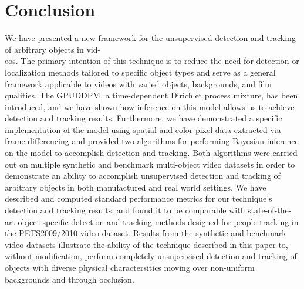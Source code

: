 \documentclass{article}
\begin{document}

\section{Conclusion}
\label{sec:conclusion}

We have presented a new framework for the unsupervised detection and tracking of arbitrary objects in vid-\\eos. The primary intention of this technique is to reduce the need for detection or localization methods tailored to specific object types and serve as a general framework applicable to videos with varied objects, backgrounds, and film qualities. The GPUDDPM, a time-dependent Dirichlet process mixture, has been introduced, and we have shown how inference on this model allows us to achieve detection and tracking results. Furthermore, we have demonstrated a specific implementation of the model using spatial and color pixel data extracted via frame differencing and provided two algorithms for performing Bayesian inference on the model to accomplish detection and tracking. Both algorithms were carried out on multiple synthetic and benchmark multi-object video datasets in order to demonstrate an ability to accomplish unsupervised detection and tracking of arbitrary objects in both manufactured and real world settings. We have described and computed standard performance metrics for our technique's detection and tracking results, and found it to be comparable with state-of-the-art object-specific detection and tracking methods designed for people tracking in the PETS2009/2010 video dataset. Results from the synthetic and benchmark video datasets illustrate the ability of the technique described in this paper to, without modification, perform completely unsupervised detection and tracking of objects with diverse physical charactersitics moving over non-uniform backgrounds and through occlusion.

\end{document}
